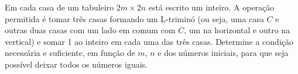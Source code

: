 Em cada casa de um tabuleiro $2m \times 2n$ está escrito um inteiro.
A operação permitida é tomar três casas formando um L-triminó (ou seja, uma casa $C$ e outras duas casas com um lado em comum com $C$, um na horizontal e outro na vertical) e somar 1 ao inteiro em cada uma das três casas.
Determine a condição necessária e suficiente, em função de $m$, $n$ e dos números iniciais, para que seja possível deixar todos os números iguais.